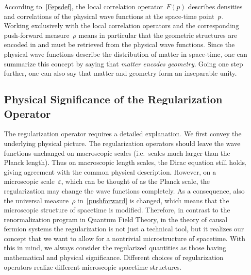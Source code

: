 \documentclass[reqno,11pt]{amsart}
\numberwithin{equation}{section}
\newcommand{\1}{\mbox{\rm 1 \hspace{-1.05 em} 1}}
\newcommand\mpar[1]{\marginpar {\flushleft\sffamily\footnotesize #1}}
\begin{document}
According to~\eqref{Fepsdef}, 
the local correlation operator~$F(p)$ describes 
densities and correlations of the physical
wave functions at the space-time point~$p$.
Working exclusively with the local correlation operators and the
corresponding push-forward measure~$\rho$ means in particular
that the geometric structures are encoded in and must be retrieved from the physical wave functions.
Since the physical wave functions describe the distribution of
matter in space-time, one can summarize this concept
by saying that {\em{matter encodes geometry}}.
Going one step further, one can also say that matter and geometry form an inseparable unity.


\subsection{Physical Significance of the Regularization Operator} \label{secregop}
The regularization operator requires a detailed explanation.
We first convey the underlying physical picture.
The regularization operators should leave the wave functions unchanged on macroscopic
scales (i.e.\ scales much larger than the Planck length).
Thus on macroscopic length scales, the Dirac equation still holds,
giving agreement with the common physical description.
However, on a microscopic scale~$\varepsilon$, which can be thought of as the Planck scale,
the regularization may change the wave functions completely.
As a consequence, also the universal measure~$\rho$ in~\eqref{pushforward} is changed,
which means that the microscopic structure of spacetime is modified.
Therefore, in contrast to the renormalization program in Quantum Field Theory,
in the theory of causal fermion systems the regularization is not just a technical tool,
but it realizes our concept that we want to allow for a nontrivial microstructure
of spacetime. With this in mind, we always consider the regularized quantities as
those having mathematical and physical significance. Different choices of regularization operators
realize different microscopic spacetime structures.
\end{document}

